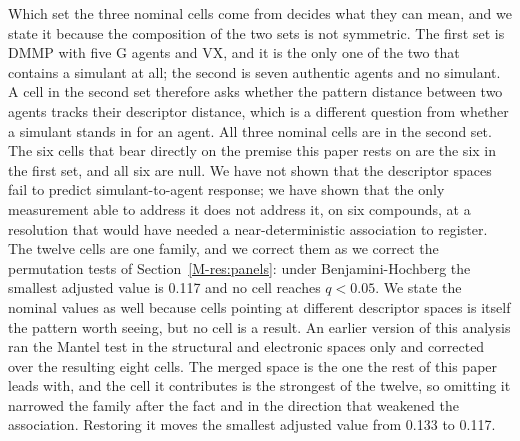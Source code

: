 \documentclass[journal=jacsat,manuscript=suppinfo,margin=1in]{achemso}
\begin{document}
Which set the three nominal cells come from decides what they can mean, and we
state it because the composition of the two sets is not symmetric. The first set
is DMMP with five G agents and VX, and it is the only one of the two that
contains a simulant at all; the second is seven authentic agents and no
simulant. A cell in the second set therefore asks whether the pattern distance
between two agents tracks their descriptor distance, which is a different
question from whether a simulant stands in for an agent. All three nominal cells
are in the second set. The six cells that bear directly on the premise this
paper rests on are the six in the first set, and all six are null. We have not
shown that the descriptor spaces fail to predict simulant-to-agent response; we
have shown that the only measurement able to address it does not address it, on
six compounds, at a resolution that would have needed a near-deterministic
association to register. The twelve cells are one
family, and we correct them as we correct the permutation tests of
Section~\ref{M-res:panels}: under Benjamini-Hochberg the smallest adjusted value is
0.117 and no cell reaches $q<0.05$. We state the nominal values as well because
cells pointing at different descriptor spaces is itself the pattern worth
seeing, but no cell is a result. An earlier version of this analysis ran the
Mantel test in the structural and electronic spaces only and corrected over the
resulting eight cells. The merged space is the one the rest of this paper leads
with, and the cell it contributes is the strongest of the twelve, so omitting it
narrowed the family after the fact and in the direction that weakened the
association. Restoring it moves the smallest adjusted value from 0.133 to
0.117.
\end{document}
